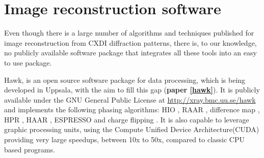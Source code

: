 \section{Image reconstruction software}

Even though there is a large number of algorithms and techniques published for
image reconstruction from CXDI diffraction patterns, there is, to our knowledge, no publicly available
software package that integrates all these tools into an easy to use package.

Hawk, is an open source software package for data processing, which is being
developed in Uppsala, with the aim to fill
this gap ({\bf paper \ref{hawk}}). It is publicly available under the GNU General Public License at
\url{http://xray.bmc.uu.se/hawk}  and implements the following phasing algorithms:
 HIO \cite{Fienup1982Phase}, RAAR \cite{Luke2005Relaxed}, difference map
 \cite{Elser2003Phase}, HPR \cite{Bauschke2003Hybrid}, HAAR \cite{Bauschke2006Strongly}, ESPRESSO
\cite{Marchesini2008Ab} and charge flipping
\cite{Oszlanyi2004Ab,Oszlanyi2005It}. It is also
capable to leverage graphic processing units, using the Compute Unified Device
Architecture(CUDA) providing very large speedups, between 10x to 50x, compared to classic CPU based programs. 

